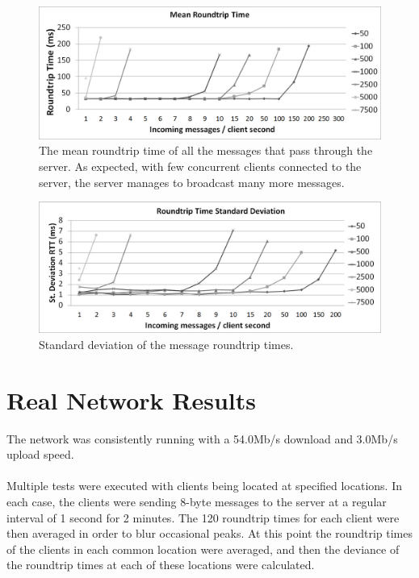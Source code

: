\documentclass[bsc,frontabs,twoside,singlespacing,parskip,deptreport]{infthesis}     %
\begin{document}
\begin{center}

\begin{figure}[h]
\centering
\includegraphics[scale=0.32]{images/test_SERVER_RTTmean.jpg}
\caption{The mean roundtrip time of all the messages that pass through the server. As expected, with few concurrent clients connected to the server, the server manages to broadcast many more messages.}
\label{fig:broadcast_rtt_mean}
\end{figure}



\begin{figure}
\centering
\includegraphics[scale=0.32]{images/test_SERVER_RTTstd.jpg}
\caption{Standard deviation of the message roundtrip times.}
\label{fig:broadcast_rtt_std}
\end{figure}

\end{center}



\section{Real Network Results}
The network was consistently running with a 54.0Mb/s download and 3.0Mb/s upload speed.
\paragraph*{}Multiple tests were executed with clients being located at specified locations. In each case, the clients were sending 8-byte messages to the server at a regular interval of 1 second for 2 minutes. The 120 roundtrip times for each client were then averaged in order to blur occasional peaks. At this point the roundtrip times of the clients in each common location were averaged, and then the deviance of the roundtrip times at each of these locations were calculated.
\end{document}

